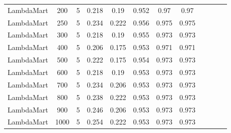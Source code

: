 \begin{longtable}{*{12}{c}}
LambdaMart & 200 & 5 & 0.218 & 0.19 & 0.952 & 0.97 & 0.97 \\ 
LambdaMart & 250 & 5 & 0.234 & 0.222 & 0.956 & 0.975 & 0.975 \\ 
LambdaMart & 300 & 5 & 0.218 & 0.19 & 0.955 & 0.973 & 0.973 \\ 
LambdaMart & 400 & 5 & 0.206 & 0.175 & 0.953 & 0.971 & 0.971 \\ 
LambdaMart & 500 & 5 & 0.222 & 0.175 & 0.954 & 0.973 & 0.973 \\ 
LambdaMart & 600 & 5 & 0.218 & 0.19 & 0.953 & 0.973 & 0.973 \\ 
LambdaMart & 700 & 5 & 0.234 & 0.206 & 0.953 & 0.973 & 0.973 \\ 
LambdaMart & 800 & 5 & 0.238 & 0.222 & 0.953 & 0.973 & 0.973 \\ 
LambdaMart & 900 & 5 & 0.246 & 0.206 & 0.953 & 0.973 & 0.973 \\ 
LambdaMart & 1000 & 5 & 0.254 & 0.222 & 0.953 & 0.973 & 0.973 \\ 
\end{longtable}
